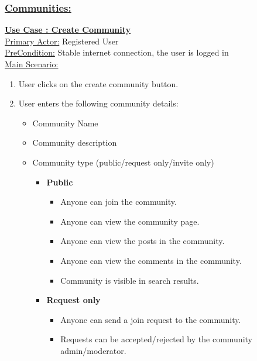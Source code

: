 \documentclass[conference,compsoc]{IEEEtran}
\newcounter{UC}
\newcommand{\nextU}{\stepcounter{UC}\theUC}
\begin{document}
\subsubsection{\underline{Communities:}}

\underline{\textbf{Use Case \nextU: Create Community}}\\

\underline{Primary Actor:} Registered User\\

\underline{PreCondition:} Stable internet connection, the user is logged in\\

\underline{Main Scenario:}\\

\begin{enumerate}
    \item User clicks on the create community button.
    \item User enters the following community details:
          \begin{itemize}
              \item Community Name
              \item Community description
              \item Community type (public/request only/invite only)
                    \begin{itemize}
                        \item \textbf{Public}
                              \begin{itemize}
                                  \item Anyone can join the community.
                                  \item Anyone can view the community page.
                                  \item Anyone can view the posts in the community.
                                  \item Anyone can view the comments in the community.
                                  \item Community is visible in search results.
                              \end{itemize}
                        \item \textbf{Request only}
                              \begin{itemize}
                                  \item Anyone can send a join request to the community.
                                  \item Requests can be accepted/rejected by the community admin/moderator.

\end{itemize}
\end{itemize}
\end{itemize}
\end{enumerate}
\end{document}
